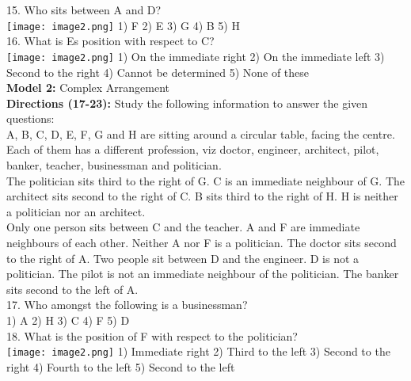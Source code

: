 \documentclass[
]{article}
\begin{document}
15. Who sits between A and D?\\
\texttt{[image: image2.png]}
1) F \hspace{2mm}2) E \hspace{2mm}3) G \hspace{2mm}4) B \hspace{2mm}5) H\\

16. What is Es position with respect to C?\\
\texttt{[image: image2.png]}
1) On the immediate right \hspace{2mm}2) On the immediate left \hspace{2mm}3) Second to the right
\hspace{2mm}4) Cannot be determined \hspace{2mm}5) None of these\\

\textbf{Model 2:} Complex Arrangement\\

\textbf{Directions (17-23):} Study the following information to answer the given questions:\\
A, B, C,
D, E, F, G and H are sitting around a circular table, facing the centre. Each of them has a
different profession, viz doctor, engineer, architect, pilot, banker, teacher, businessman and
politician.\\
The politician sits third to the right of G. C is an immediate neighbour of G. The architect sits
second to the right of C. B sits third to the right of H. H is neither a politician nor an architect.\\
Only one person sits between C and the teacher. A and F are immediate neighbours of each
other. Neither A nor F is a politician. The doctor sits second to the right of A. Two people sit
between D and the engineer. D is not a politician. The pilot is not an immediate neighbour of
the politician. The banker sits second to the left of A.\\
17. Who amongst the following is a businessman?\\
1) A \hspace{2mm}2) H \hspace{2mm}3) C \hspace{2mm}4) F \hspace{2mm}5) D\\

18. What is the position of F with respect to the politician?\\
\texttt{[image: image2.png]}
1) Immediate right \hspace{2mm}2) Third to the left \hspace{2mm}3) Second to the right
\hspace{2mm}4) Fourth to the left \hspace{2mm}5) Second to the left\\
\end{document}
